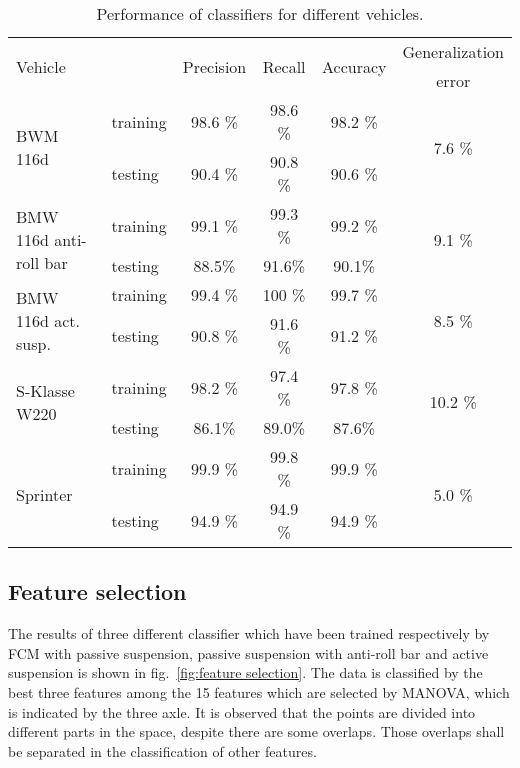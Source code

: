 \begin{table}
\centering
\caption{Performance of classifiers for different vehicles.}
\label{tbl:vehicle train test}
\begin{tabular}{llcccc}
\hline
\multirow{2}{*}{Vehicle} & & \multirow{2}{*}{Precision} & \multirow{2}{*}{Recall} & \multirow{2}{*}{Accuracy} & Generalization \\ 
 & & & & & error \\ \hline
\multirow{2}{*}{BWM 116d} & training & 98.6 \% & 98.6 \% & 98.2 \% & \multirow{2}{*}{7.6 \%} \\
 & testing & 90.4 \% & 90.8 \% & 90.6 \% &  \\ \hline
\multirow{2}{*}{BMW 116d anti-roll bar} & training & 99.1 \% & 99.3 \% & 99.2 \% &  \multirow{2}{*}{9.1 \%} \\
 & testing & 88.5\% & 91.6\% & 90.1\% &  \\ \hline
\multirow{2}{*}{BMW 116d act. susp.} & training & 99.4 \% & 100 \% & 99.7 \% &  \multirow{2}{*}{8.5 \%} \\
 & testing & 90.8 \% & 91.6 \% & 91.2 \% &  \\ 
 \hline
\multirow{2}{*}{S-Klasse W220} & training & 98.2 \% & 97.4 \% & 97.8 \% &  \multirow{2}{*}{10.2 \%} \\
 & testing & 86.1\% & 89.0\% & 87.6\% &  \\ \hline
\multirow{2}{*}{Sprinter} & training & 99.9 \% & 99.8 \% & 99.9 \% &  \multirow{2}{*}{5.0 \%} \\ 
 & testing & 94.9 \% & 94.9 \% & 94.9 \% &  \\ \hline
\end{tabular}
\end{table}


\subsection{Feature selection}
\label{subsec:variationfeatureselection}

The results of three different classifier which have been trained respectively by \ac{FCM} with passive suspension, passive suspension with anti-roll bar and active suspension is shown in fig.~\ref{fig:feature selection}.
%
The data is classified by the best three features among the 15 features which are selected by \ac{MANOVA}, which is indicated by the three axle.
%
It is observed that the points are divided into different parts in the space, despite there are some overlaps.
%
Those overlaps shall be separated in the classification of other features. 

